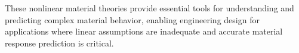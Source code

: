 \begin{subox}[Summary]
These nonlinear material theories provide essential tools for understanding and predicting complex material behavior, enabling engineering design for applications where linear assumptions are inadequate and accurate material response prediction is critical.
\end{subox}